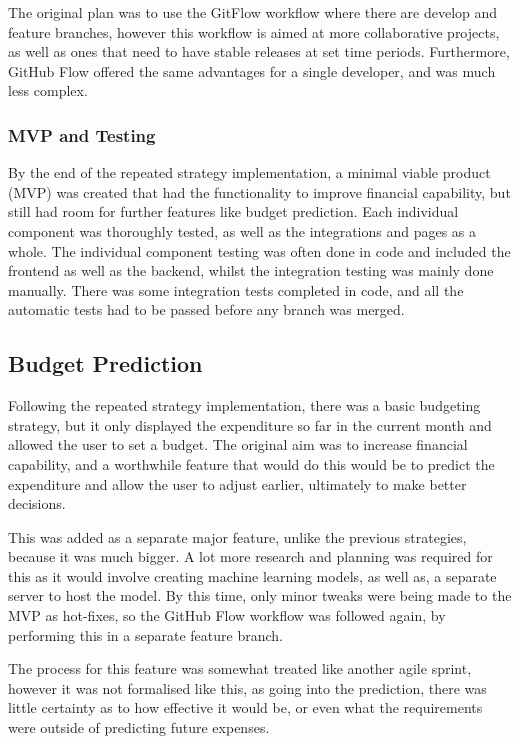 The original plan was to use the GitFlow workflow \cite{GitFlow} where there are develop and feature branches, however this workflow is aimed at more collaborative projects, as well as ones that need to have stable releases at set time periods. Furthermore, GitHub Flow offered the same advantages for a single developer, and was much less complex.

\subsubsection{MVP and Testing}
By the end of the repeated strategy implementation, a minimal viable product (MVP) was created that had the functionality to improve financial capability, but still had room for further features like budget prediction. Each individual component was thoroughly tested, as well as the integrations and pages as a whole. The individual component testing was often done in code and included the frontend as well as the backend, whilst the integration testing was mainly done manually. There was some integration tests completed in code, and all the automatic tests had to be passed before any branch was merged.

\subsection{Budget Prediction}
Following the repeated strategy implementation, there was a basic budgeting strategy, but it only displayed the expenditure so far in the current month and allowed the user to set a budget. The original aim was to increase financial capability, and a worthwhile feature that would do this would be to predict the expenditure and allow the user to adjust earlier, ultimately to make better decisions.

This was added as a separate major feature, unlike the previous strategies, because it was much bigger. A lot more research and planning was required for this as it would involve creating machine learning models, as well as, a separate server to host the model. By this time, only minor tweaks were being made to the MVP as hot-fixes, so the GitHub Flow workflow was followed again, by performing this in a separate feature branch.

The process for this feature was somewhat treated like another agile sprint, however it was not formalised like this, as going into the prediction, there was little certainty as to how effective it would be, or even what the requirements were outside of predicting future expenses.

